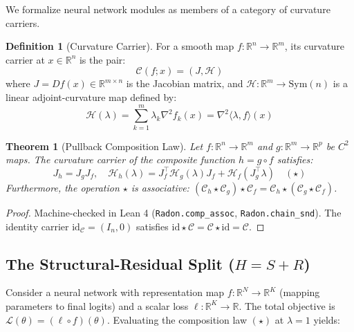 \documentclass[11pt,a4paper]{article}
\newtheorem{theorem}{Theorem}
\theoremstyle{definition}
\newtheorem{definition}{Definition}
\theoremstyle{remark}
\begin{document}
We formalize neural network modules as members of a category of curvature carriers.
\begin{definition}[Curvature Carrier]
For a smooth map $f: \mathbb{R}^n \to \mathbb{R}^m$, its curvature carrier at $x \in \mathbb{R}^n$ is the pair:
\begin{equation}
\mathcal{C}(f; x) = (J, \mathcal{H})
\end{equation}
where $J = Df(x) \in \mathbb{R}^{m \times n}$ is the Jacobian matrix, and $\mathcal{H}: \mathbb{R}^m \to \mathrm{Sym}(n)$ is a linear adjoint-curvature map defined by:
\begin{equation}
\mathcal{H}(\lambda) = \sum_{k=1}^m \lambda_k \nabla^2 f_k(x) = \nabla^2 \langle \lambda, f \rangle(x)
\end{equation}
\end{definition}

\begin{theorem}[Pullback Composition Law]
Let $f: \mathbb{R}^n \to \mathbb{R}^m$ and $g: \mathbb{R}^m \to \mathbb{R}^p$ be $C^2$ maps. The curvature carrier of the composite function $h = g \circ f$ satisfies:
\begin{equation}
J_h = J_g J_f, \quad \mathcal{H}_h(\lambda) = J_f^\top \mathcal{H}_g(\lambda) J_f + \mathcal{H}_f(J_g^\top \lambda) \quad (\star)
\end{equation}
Furthermore, the operation $\star$ is associative: $(\mathcal{C}_h \star \mathcal{C}_g) \star \mathcal{C}_f = \mathcal{C}_h \star (\mathcal{C}_g \star \mathcal{C}_f)$.
\end{theorem}
\begin{proof}
Machine-checked in Lean 4 (\texttt{Radon.comp\_assoc}, \texttt{Radon.chain\_snd}). The identity carrier $\mathrm{id}_{\mathcal{C}} = (I_n, 0)$ satisfies $\mathrm{id} \star \mathcal{C} = \mathcal{C} \star \mathrm{id} = \mathcal{C}$.
\end{proof}

\subsection{The Structural-Residual Split ($H = S + R$)}

Consider a neural network with representation map $f: \mathbb{R}^N \to \mathbb{R}^K$ (mapping parameters to final logits) and a scalar loss $\ell: \mathbb{R}^K \to \mathbb{R}$. The total objective is $\mathcal{L}(\theta) = (\ell \circ f)(\theta)$.
Evaluating the composition law $(\star)$ at $\lambda = 1$ yields:
\end{document}
